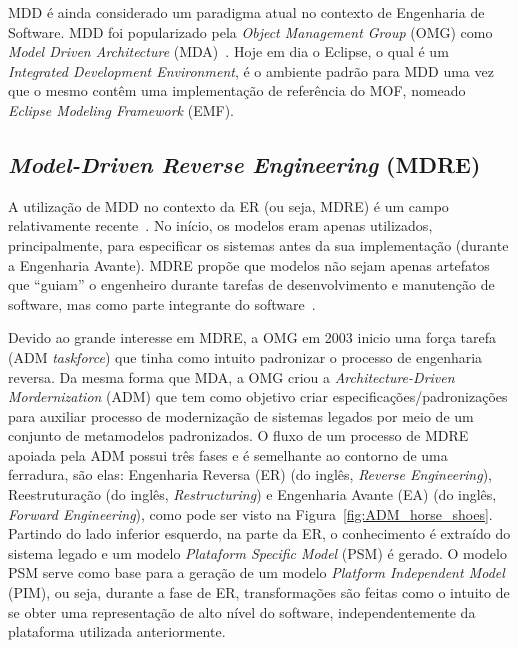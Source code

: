 MDD é ainda considerado um paradigma atual no contexto de Engenharia de Software. MDD foi popularizado pela \textit{Object Management Group} (OMG) como \textit{Model Driven Architecture} (MDA)~\citep{Kleppe:2003}. Hoje em dia o Eclipse, o qual é um \textit{Integrated Development Environment}, é o ambiente padrão para MDD uma vez que o mesmo contêm uma implementação de referência do MOF, nomeado \textit{Eclipse Modeling Framework} (EMF).

\subsection{\textit{Model-Driven Reverse Engineering} (MDRE)}\label{sec:model_driven_reverse_engineering}

A utilização de MDD no contexto da ER (ou seja, MDRE) é um campo relativamente recente~\citep{Model_Driven_Reverse_Engineering}. No início, os modelos eram apenas utilizados, principalmente, para especificar os sistemas antes da sua implementação (durante a Engenharia Avante). MDRE propõe que modelos não sejam apenas artefatos que ``guiam'' o engenheiro durante tarefas de desenvolvimento e manutenção de software, mas como parte integrante do software~\citep{ThomasMDD}.


Devido ao grande interesse em MDRE, a OMG em 2003 inicio uma força tarefa (ADM \textit{taskforce}) que tinha como intuito padronizar o processo de engenharia reversa. Da mesma forma que MDA, a OMG criou a \textit{Architecture-Driven Mordernization} (ADM) que tem como objetivo criar especificações/padronizações para auxiliar processo de modernização de sistemas legados por meio de um conjunto de metamodelos padronizados. O fluxo de um processo de MDRE apoiada pela ADM possui três fases e é semelhante ao contorno de uma ferradura, são elas: Engenharia Reversa (ER) (do inglês, \textit{Reverse Engineering}), Reestruturação (do inglês, \textit{Restructuring}) e Engenharia Avante (EA) (do inglês, \textit{Forward Engineering}), como pode ser visto na Figura~\ref{fig:ADM_horse_shoes}. Partindo do lado inferior esquerdo, na parte da ER, o conhecimento é extraído do sistema legado e um modelo \textit{Plataform Specific Model} (PSM) é gerado. O modelo PSM serve como base para a geração de um modelo \textit{Platform Independent Model} (PIM), ou seja, durante a fase de ER, transformações são feitas como o intuito de se obter uma representação de alto nível do software, independentemente da plataforma utilizada anteriormente.

